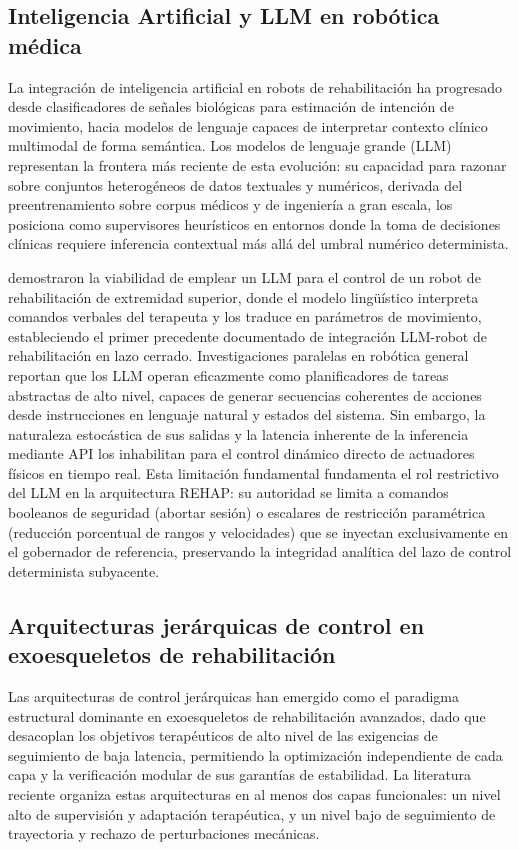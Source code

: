 \documentclass[a4paper,12pt]{article}
\begin{document}
\subsection{Inteligencia Artificial y LLM en robótica médica}

La integración de inteligencia artificial en robots de rehabilitación ha progresado desde clasificadores de señales biológicas para estimación de intención de movimiento, hacia modelos de lenguaje capaces de interpretar contexto clínico multimodal de forma semántica. Los modelos de lenguaje grande (LLM) representan la frontera más reciente de esta evolución: su capacidad para razonar sobre conjuntos heterogéneos de datos textuales y numéricos, derivada del preentrenamiento sobre corpus médicos y de ingeniería a gran escala, los posiciona como supervisores heurísticos en entornos donde la toma de decisiones clínicas requiere inferencia contextual más allá del umbral numérico determinista.

\citet{rifai2024upper} demostraron la viabilidad de emplear un LLM para el control de un robot de rehabilitación de extremidad superior, donde el modelo lingüístico interpreta comandos verbales del terapeuta y los traduce en parámetros de movimiento, estableciendo el primer precedente documentado de integración LLM-robot de rehabilitación en lazo cerrado. Investigaciones paralelas en robótica general reportan que los LLM operan eficazmente como planificadores de tareas abstractas de alto nivel, capaces de generar secuencias coherentes de acciones desde instrucciones en lenguaje natural y estados del sistema. Sin embargo, la naturaleza estocástica de sus salidas y la latencia inherente de la inferencia mediante API los inhabilitan para el control dinámico directo de actuadores físicos en tiempo real. Esta limitación fundamental fundamenta el rol restrictivo del LLM en la arquitectura REHAP: su autoridad se limita a comandos booleanos de seguridad (abortar sesión) o escalares de restricción paramétrica (reducción porcentual de rangos y velocidades) que se inyectan exclusivamente en el gobernador de referencia, preservando la integridad analítica del lazo de control determinista subyacente.

\subsection{Arquitecturas jerárquicas de control en exoesqueletos de rehabilitación}

Las arquitecturas de control jerárquicas han emergido como el paradigma estructural dominante en exoesqueletos de rehabilitación avanzados, dado que desacoplan los objetivos terapéuticos de alto nivel de las exigencias de seguimiento de baja latencia, permitiendo la optimización independiente de cada capa y la verificación modular de sus garantías de estabilidad. La literatura reciente organiza estas arquitecturas en al menos dos capas funcionales: un nivel alto de supervisión y adaptación terapéutica, y un nivel bajo de seguimiento de trayectoria y rechazo de perturbaciones mecánicas.
\end{document}
